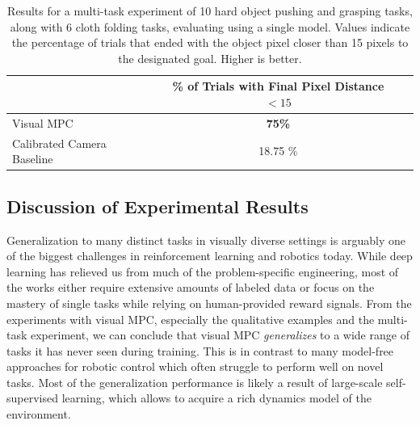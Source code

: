 \label{subsec:cloth_folding_data}
\begin{table}
\centering
{\footnotesize
\begin{tabular}{lcc}
	\toprule
         &  \thead{\% of Trials with \\ Final Pixel Distance $< 15$}   \\
         \midrule
  Visual MPC & \textbf{75\%} \\ 
  Calibrated Camera Baseline & 18.75 \% \\
  \bottomrule
\end{tabular}
}
\caption{Results for a multi-task experiment of 10 hard object pushing and grasping tasks, along with 6 cloth folding tasks, evaluating using a single model. Values indicate the percentage of trials that ended with the object pixel closer than 15 pixels to the designated goal. Higher is better.} 
\label{table:cloth_folding}
\end{table}

\subsection{Discussion of Experimental Results}

Generalization to many distinct tasks in visually diverse settings is arguably one of the biggest challenges in reinforcement learning and robotics today. While deep learning has relieved us from much of the problem-specific engineering, most of the works either require extensive amounts of labeled data or focus on the mastery of single tasks while relying on human-provided reward signals. 
From the experiments with visual MPC, especially the qualitative examples and the multi-task experiment, we can conclude that visual MPC \emph{generalizes} to a wide range of tasks it has never seen during training. This is in contrast to many model-free approaches for robotic control which often struggle to perform well on novel tasks. Most of the generalization performance is likely a result of large-scale self-supervised learning, which allows to acquire a rich dynamics model of the environment. 